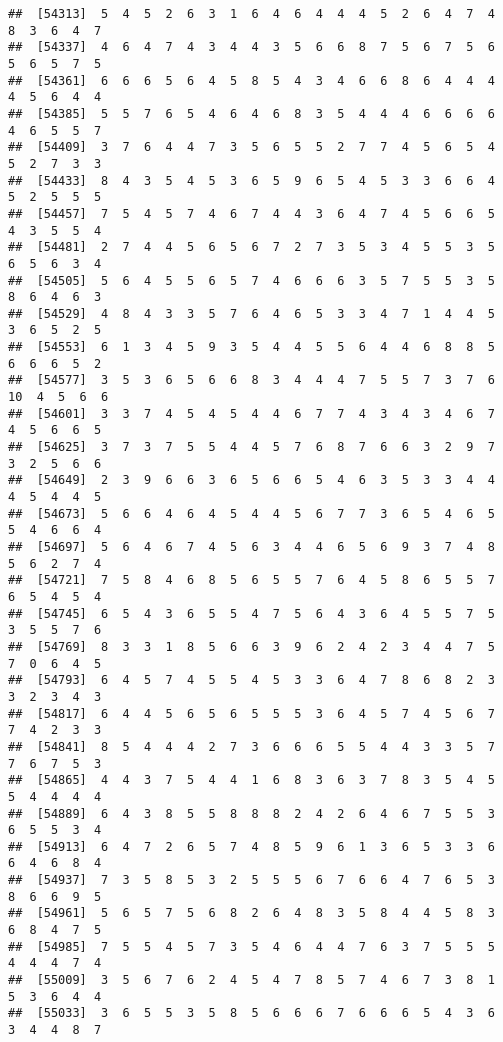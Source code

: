 \documentclass[
]{book}
\begin{document}
\begin{verbatim}
##  [54313]  5  4  5  2  6  3  1  6  4  6  4  4  4  5  2  6  4  7  4  8  3  6  4  7
##  [54337]  4  6  4  7  4  3  4  4  3  5  6  6  8  7  5  6  7  5  6  5  6  5  7  5
##  [54361]  6  6  6  5  6  4  5  8  5  4  3  4  6  6  8  6  4  4  4  4  5  6  4  4
##  [54385]  5  5  7  6  5  4  6  4  6  8  3  5  4  4  4  6  6  6  6  4  6  5  5  7
##  [54409]  3  7  6  4  4  7  3  5  6  5  5  2  7  7  4  5  6  5  4  5  2  7  3  3
##  [54433]  8  4  3  5  4  5  3  6  5  9  6  5  4  5  3  3  6  6  4  5  2  5  5  5
##  [54457]  7  5  4  5  7  4  6  7  4  4  3  6  4  7  4  5  6  6  5  4  3  5  5  4
##  [54481]  2  7  4  4  5  6  5  6  7  2  7  3  5  3  4  5  5  3  5  6  5  6  3  4
##  [54505]  5  6  4  5  5  6  5  7  4  6  6  6  3  5  7  5  5  3  5  8  6  4  6  3
##  [54529]  4  8  4  3  3  5  7  6  4  6  5  3  3  4  7  1  4  4  5  3  6  5  2  5
##  [54553]  6  1  3  4  5  9  3  5  4  4  5  5  6  4  4  6  8  8  5  6  6  6  5  2
##  [54577]  3  5  3  6  5  6  6  8  3  4  4  4  7  5  5  7  3  7  6 10  4  5  6  6
##  [54601]  3  3  7  4  5  4  5  4  4  6  7  7  4  3  4  3  4  6  7  4  5  6  6  5
##  [54625]  3  7  3  7  5  5  4  4  5  7  6  8  7  6  6  3  2  9  7  3  2  5  6  6
##  [54649]  2  3  9  6  6  3  6  5  6  6  5  4  6  3  5  3  3  4  4  4  5  4  4  5
##  [54673]  5  6  6  4  6  4  5  4  4  5  6  7  7  3  6  5  4  6  5  5  4  6  6  4
##  [54697]  5  6  4  6  7  4  5  6  3  4  4  6  5  6  9  3  7  4  8  5  6  2  7  4
##  [54721]  7  5  8  4  6  8  5  6  5  5  7  6  4  5  8  6  5  5  7  6  5  4  5  4
##  [54745]  6  5  4  3  6  5  5  4  7  5  6  4  3  6  4  5  5  7  5  3  5  5  7  6
##  [54769]  8  3  3  1  8  5  6  6  3  9  6  2  4  2  3  4  4  7  5  7  0  6  4  5
##  [54793]  6  4  5  7  4  5  5  4  5  3  3  6  4  7  8  6  8  2  3  3  2  3  4  3
##  [54817]  6  4  4  5  6  5  6  5  5  5  3  6  4  5  7  4  5  6  7  7  4  2  3  3
##  [54841]  8  5  4  4  4  2  7  3  6  6  6  5  5  4  4  3  3  5  7  7  6  7  5  3
##  [54865]  4  4  3  7  5  4  4  1  6  8  3  6  3  7  8  3  5  4  5  5  4  4  4  4
##  [54889]  6  4  3  8  5  5  8  8  8  2  4  2  6  4  6  7  5  5  3  6  5  5  3  4
##  [54913]  6  4  7  2  6  5  7  4  8  5  9  6  1  3  6  5  3  3  6  6  4  6  8  4
##  [54937]  7  3  5  8  5  3  2  5  5  5  6  7  6  6  4  7  6  5  3  8  6  6  9  5
##  [54961]  5  6  5  7  5  6  8  2  6  4  8  3  5  8  4  4  5  8  3  6  8  4  7  5
##  [54985]  7  5  5  4  5  7  3  5  4  6  4  4  7  6  3  7  5  5  5  4  4  4  7  4
##  [55009]  3  5  6  7  6  2  4  5  4  7  8  5  7  4  6  7  3  8  1  5  3  6  4  4
##  [55033]  3  6  5  5  3  5  8  5  6  6  6  7  6  6  6  5  4  3  6  3  4  4  8  7

\end{verbatim}
\end{document}
